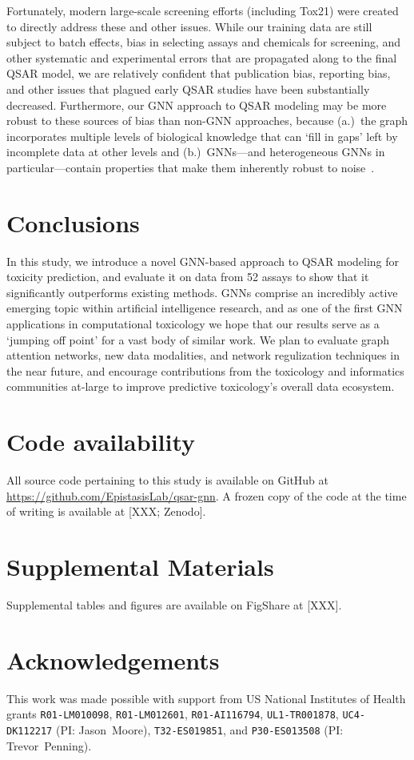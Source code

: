 \documentclass{ws-procs11x85}
\begin{document}
Fortunately, modern large-scale screening efforts (including Tox21) were created to directly address these and other issues.
While our training data are still subject to batch effects, bias in selecting assays and chemicals for screening, and other systematic and experimental errors that are propagated along to the final QSAR model, we are relatively confident that publication bias, reporting bias, and other issues that plagued early QSAR studies have been substantially decreased. Furthermore, our GNN approach to QSAR modeling may be more robust to these sources of bias than non-GNN approaches, because (a.)~the graph incorporates multiple levels of biological knowledge that can `fill in gaps' left by incomplete data at other levels and (b.)~GNNs---and heterogeneous GNNs in particular---contain properties that make them inherently robust to noise~\cite{xie2020heterogeneous,nt2019revisiting}.
\section{Conclusions}
In this study, we introduce a novel GNN-based approach to QSAR modeling for toxicity prediction, and evaluate it on data from 52 assays to show that it significantly outperforms existing methods.
GNNs comprise an incredibly active emerging topic within artificial intelligence research, and as one of the first GNN applications in computational toxicology we hope that our results serve as a `jumping off point' for a vast body of similar work.
We plan to evaluate graph attention networks, new data modalities, and network regulization techniques in the near future, and encourage contributions from the toxicology and informatics communities at-large to improve predictive toxicology's overall data ecosystem.
\section{Code availability}
All source code pertaining to this study is available on GitHub at \url{https://github.com/EpistasisLab/qsar-gnn}.
A frozen copy of the code at the time of writing is available at [XXX; Zenodo].

\section{Supplemental Materials}
Supplemental tables and figures are available on FigShare at [XXX].

\section*{Acknowledgements}
This work was made possible with support from US National Institutes of Health grants \texttt{R01-LM010098}, \texttt{R01-LM012601}, \texttt{R01-AI116794}, \texttt{UL1-TR001878}, \texttt{UC4-DK112217} (PI: Jason~Moore), \texttt{T32-ES019851}, and \texttt{P30-ES013508} (PI: Trevor~Penning).
\end{document}
